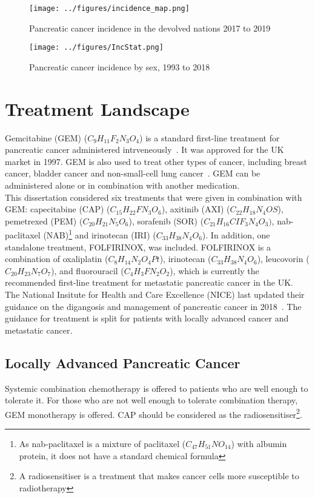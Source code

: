\begin{figure}[h]
    \centering
    \texttt{[image: ../figures/incidence\_map.png]}
    \caption{Pancreatic cancer incidence in the devolved nations 2017 to 2019}
    \label{pancIncMap}
\end{figure}

\begin{figure}[h]
    \centering
    \texttt{[image: ../figures/IncStat.png]}
    \caption{Pancreatic cancer incidence by sex, 1993 to 2018}
    \label{pancInc}
\end{figure}

\section{Treatment Landscape}
Gemcitabine (GEM) ($C_9H_{11}F_2N_3O_4$) is a standard first-line treatment for pancreatic cancer administered intrveneously~\cite{NG85}. It was approved for the UK market in 1997. GEM is also used to treat other types of cancer, including breast cancer, bladder cancer and non-small-cell lung cancer~\cite{wong2009}. GEM can be administered alone or in combination with another medication.\\

This dissertation considered six treatments that were given in combination with GEM: capecitabine (CAP) ($C_{15}H_{22}FN_3O_6$), axitinib (AXI) ($C_{22}H_{18}N_4OS$), pemetrexed (PEM) ($C_{20}H_{21}N_5O_6$), sorafenib (SOR) ($C_{21}H_{16}CIF_{3}N_4O_3)$, nab-paclitaxel (NAB)\footnote{As nab-paclitaxel is a mixture of paclitaxel ($C_{47}H_{51}NO_{14}$) with albumin protein, it does not have a standard chemical formula} and irinotecan (IRI) ($C_{33}H_{38}N_4O_6$). In addition, one standalone treatment, FOLFIRINOX, was included. FOLFIRINOX is a combination of oxaliplatin ($C_{8}H_{14}N_{2}O_{4}Pt$), irinotecan ($C_{33}H_{38}N_{4}O_{6}$), leucovorin ($C_{20}H_{23}N_{7}O_{7}$), and fluorouracil ($C_{4}H_{3}FN_{2}O_{2}$), which is currently the recommended first-line treatment for metastatic pancreatic cancer in the UK.\\

The National Insitute for Health and Care Excellence (NICE) last updated their guidance on the digangosis and management of pancreatic cancer in 2018~\cite{NG85}. The guidance for treatment is split for patients with locally advanced cancer and metastatic cancer.

\subsection{Locally Advanced Pancreatic Cancer}
Systemic combination chemotherapy is offered to patients who are well enough to tolerate it. For those who are not well enough to tolerate combination therapy, GEM monotherapy is offered. CAP should be considered as the radiosensitiser\footnote{A radiosensitiser is a treatment that makes cancer cells more susceptible to radiotherapy}.

